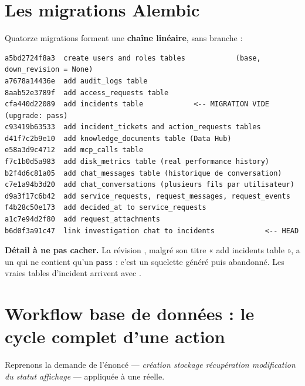 \section{Les migrations Alembic}

Quatorze migrations forment une \textbf{chaîne linéaire}, sans branche :

\begin{lstlisting}[caption={Ordre réel des révisions}]
a5bd2724f8a3  create users and roles tables            (base, down_revision = None)
a7678a14436e  add audit_logs table
8aab52e3789f  add access_requests table
cfa440d22089  add incidents table            <-- MIGRATION VIDE (upgrade: pass)
c93419b63533  add incident_tickets and action_requests tables
d41f7c2b9e10  add knowledge_documents table (Data Hub)
e58a3d9c4712  add mcp_calls table
f7c1b0d5a983  add disk_metrics table (real performance history)
b2f4d6c81a05  add chat_messages table (historique de conversation)
c7e1a94b3d20  add chat_conversations (plusieurs fils par utilisateur)
d9a3f17c6b42  add service_requests, request_messages, request_events
f4b28c50e173  add decided_at to service_requests
a1c7e94d2f80  add request_attachments
b6d0f3a91c47  link investigation chat to incidents            <-- HEAD
\end{lstlisting}

\begin{warnbox}
\textbf{Détail à ne pas cacher.} La révision , malgré son
titre « add incidents table », a un  qui ne contient qu'un
\texttt{pass} : c'est un squelette généré puis abandonné. Les vraies tables
d'incident arrivent avec .
\end{warnbox}

\section{Workflow base de données : le cycle complet d'une action}

Reprenons la demande de l'énoncé --- \emph{création \arrowto{} stockage
\arrowto{} récupération \arrowto{} modification du statut \arrowto{} affichage}
--- appliquée à une  réelle.


